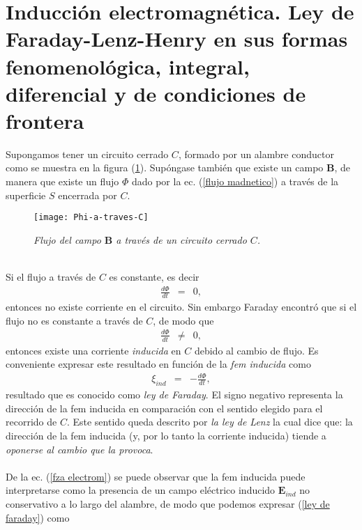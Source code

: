 
\section{Inducci\'on electromagn\'etica. Ley de Faraday-Lenz-Henry en sus formas fenomenol\'ogica, integral, diferencial y de condiciones de frontera}
Supongamos tener un circuito cerrado $C$, formado por un alambre conductor como se muestra en la figura (\ref{Phi-a-traves-C}). Sup\'ongase tambi\'en que existe un campo $\textbf{B}$, de manera que existe un flujo $\Phi$ dado por la ec. (\ref{flujo madnetico}) a trav\'es de la superficie $S$ encerrada por $C$.\\
\begin{figure}[h]
  \centering
    \texttt{[image: Phi-a-traves-C]}
        \caption{\emph{Flujo del campo $\textbf{B}$ a trav\'es de un circuito cerrado $C$.}}\label{Phi-a-traves-C}
\end{figure}\\
Si el flujo a trav\'es de $C$ es constante, es decir
\begin{eqnarray}
\frac{d\Phi}{dt}&=&0,
\end{eqnarray}
entonces no existe corriente en el circuito. Sin embargo Faraday encontr\'o que si el flujo no es constante a trav\'es de $C$, de modo que
\begin{eqnarray}
\frac{d\Phi}{dt}&\neq &0,
\end{eqnarray}
entonces existe una corriente \emph{inducida} en $C$ debido al cambio de flujo. Es conveniente expresar este resultado en funci\'on de la \emph{fem inducida} como
\begin{eqnarray}
\xi_{ind}&=&-\frac{d\Phi}{dt},\label{ley de faraday}
\end{eqnarray}
resultado que es conocido como \emph{ley de Faraday}. El signo negativo representa la direcci\'on de la fem inducida en comparaci\'on con el sentido elegido para el recorrido de $C$. Este sentido queda descrito por \emph{la ley de Lenz} la cual dice que: la direcci\'on de la fem inducida (y, por lo tanto la corriente inducida) tiende a \emph{oponerse al cambio que la provoca}.\\
\\
De la ec. (\ref{fza electrom}) se puede observar que la fem inducida puede interpretarse como la presencia de un campo el\'ectrico inducido $\textbf{E}_{ind}$ no conservativo a lo largo del alambre, de modo que podemos expresar (\ref{ley de faraday}) como
